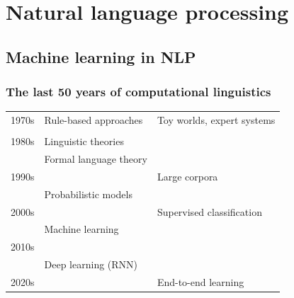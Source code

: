 \documentclass[t]{beamer} %
\begin{document}
\section{Natural language processing}

\subsection{Machine learning in NLP}

\begin{frame}
  \frametitle{The last 50 years of computational linguistics}

  \begin{center}
    \begin{tabular}{lp{4cm}p{5cm}}
      1970s & Rule-based approaches & Toy worlds, expert systems \\
            & & \\
      1980s & Linguistic theories & \\
            & Formal language theory & \\
      1990s & & Large corpora\\
            & Probabilistic models & \\
      2000s & & Supervised classification \\
            & Machine learning & \\
      2010s & & \\
            & Deep learning (RNN) & \\
      2020s & & End-to-end learning
    \end{tabular}
  \end{center}
\end{frame}
\end{document}
